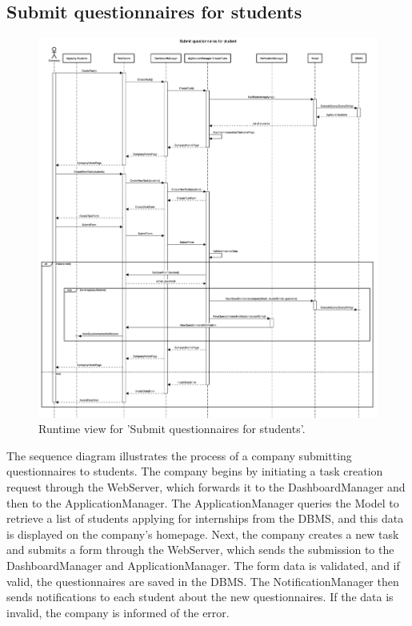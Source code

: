 \subsection{Submit questionnaires for students}
\begin{figure}[H]
    \begin{center}
        \includegraphics[width=0.8\linewidth]{DD/LaTeX/Images/RuntimeView/SubmitQuestionnaires.png}
        \caption{Runtime view for 'Submit questionnaires for students'.}
        \label{fig:runtime_SubmitQuestionnaires}%
    \end{center}
\end{figure}

The sequence diagram illustrates the process of a company submitting questionnaires to students. The company begins by initiating a task creation request through the WebServer, which forwards it to the DashboardManager and then to the ApplicationManager. The ApplicationManager queries the Model to retrieve a list of students applying for internships from the DBMS, and this data is displayed on the company's homepage. Next, the company creates a new task and submits a form through the WebServer, which sends the submission to the DashboardManager and ApplicationManager. The form data is validated, and if valid, the questionnaires are saved in the DBMS. The NotificationManager then sends notifications to each student about the new questionnaires. If the data is invalid, the company is informed of the error.

